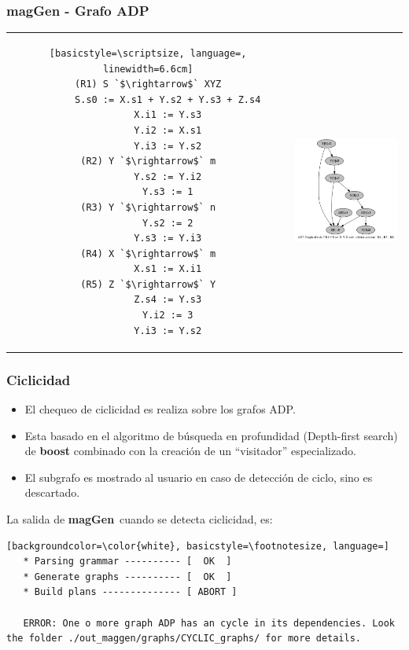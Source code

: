 \documentclass[10pt]{beamer}
\newcommand{\maggen}{\textbf{magGen}}
\begin{document}
\begin{frame}[fragile]
    \frametitle{magGen - Grafo ADP}
\begin{tabular}{c p{4.5cm}}
\hspace{-0.5cm}\begin{lstlisting}[basicstyle=\scriptsize, language=, linewidth=6.6cm]
(R1) S `$\rightarrow$` XYZ
       S.s0 := X.s1 + Y.s2 + Y.s3 + Z.s4
       X.i1 := Y.s3
       Y.i2 := X.s1
       Y.i3 := Y.s2
(R2) Y `$\rightarrow$` m
       Y.s2 := Y.i2
       Y.s3 := 1
(R3) Y `$\rightarrow$` n
       Y.s2 := 2
       Y.s3 := Y.i3
(R4) X `$\rightarrow$` m
       X.s1 := X.i1
(R5) Z `$\rightarrow$` Y
       Z.s4 := Y.s3
       Y.i2 := 3
       Y.i3 := Y.s2
\end{lstlisting}
&\hspace{0.2cm}\parbox[c]{1em}{\includegraphics[width=149px, height=150px]{./16_adp_graph.png}}
\end{tabular}

\end{frame}

\begin{frame}[fragile]
    \frametitle{Ciclicidad}

    \begin{block}{}
	\begin{itemize}
	    \item El chequeo de ciclicidad es realiza sobre los grafos ADP.
	    \pause
	    \item Esta basado en el algoritmo de búsqueda en profundidad (Depth-first search) de \textbf{boost} combinado con la creación de un ``visitador'' especializado.
	    \pause
	    \item El subgrafo es mostrado al usuario en caso de detección de ciclo, sino es descartado.
	\end{itemize}
    \end{block}
    \pause

La salida de \maggen\ cuando se detecta ciclicidad, es:

\begin{lstlisting}[backgroundcolor=\color{white}, basicstyle=\footnotesize, language=] 
   * Parsing grammar ---------- [  OK  ]
   * Generate graphs ---------- [  OK  ]
   * Build plans -------------- [ ABORT ]

   ERROR: One o more graph ADP has an cycle in its dependencies. Look the folder ./out_maggen/graphs/CYCLIC_graphs/ for more details.
\end{lstlisting}
\end{frame}
\end{document}
